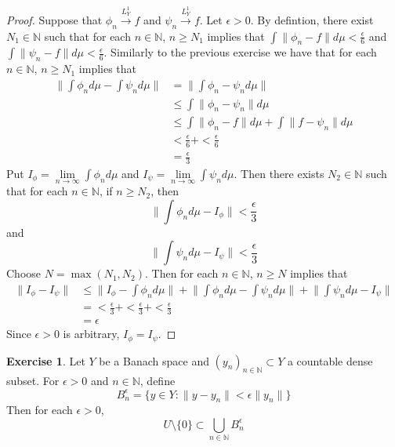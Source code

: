 \documentclass[12pt]{amsart}
\theoremstyle{definition}
\newtheorem{ex}[definition]{Exercise}
\newcommand{\ep}{\epsilon}
\newcommand{\N}{\mathbb{N}}
\newcommand{\conv}[1]{\xrightarrow{#1}}
\newcommand{\lex}[1]{\label{ex:#1}}
\begin{document}
	\begin{proof}
	Suppose that $\phi_n \conv{L^1_Y} f$ and $\psi_n \conv{L^1_Y} f$. Let $\ep >0$. By defintion, there exist $N_1 \in \N$ such that for each $n \in \N$, $ n \geq N_1$ implies that $\int \|\phi_n - f\| d\mu < \frac{\ep}{6}$ and $\int \|\psi_n - f\| d\mu < \frac{\ep}{6}$. Similarly to the previous exercise we have that for each $n \in \N$, $n \geq N_1$ implies that
	\begin{align*}
	\bigg \| \int \phi_n d\mu  - \int \psi_n d \mu \bigg \|
	&= \bigg \| \int \phi_n - \psi_n d\mu \bigg \| \\
	& \leq \int \| \phi_n - \psi_n \| d\mu \\
	& \leq  \int \| \phi_n -f \| d \mu + \int \| f - \psi_n \| d\mu 	\\
	& <  \frac{\ep}{6} + < \frac{\ep}{6} \\
	&= \frac{\ep}{3}
	\end{align*}	 
Put $I_\phi = \lim\limits_{n \rightarrow \infty} \int \phi_n d\mu$ and $I_{\psi} = \lim\limits_{n \rightarrow \infty} \int \psi_n d\mu$. Then there exists $N_2 \in \N$ such that for each $n \in \N$, if $ n \geq N_2$, then $$\bigg \| \int \phi_n d\mu - I_\phi \bigg \| < \frac{\ep}{3}$$ and $$\bigg \| \int \psi_n d\mu - I_\psi \bigg \| < \frac{\ep}{3}$$ 
	Choose $N = \max(N_1, N_2)$. Then for each $n \in \N$, $n \geq N$ implies that
	\begin{align*}
	\|I_\phi - I_\psi\| 
	& \leq \bigg \|I_\phi - \int \phi_n d\mu \bigg \| + \bigg \| \int \phi_n d\mu - \int \psi_n d\mu \bigg \| +  \bigg \| \int \psi_n d\mu - I_\psi \bigg \| \\
	& = < \frac{\ep}{3} + < \frac{\ep}{3} + < \frac{\ep}{3} \\
	&= \ep
	\end{align*}
	Since $\ep >0$ is arbitrary, $I_\phi = I_\psi$.
	\end{proof}
	
	\begin{ex} \lex{00000} 
	Let $Y$ be a Banach space and $(y_n)_{n \in \N} \subset Y$ a countable dense subset. For $\ep >0$ and $n \in \N$, define $$B^{\ep}_n = \{y \in Y: \|y - y_n\| < \ep \| y_n \| \}$$ Then for each $\ep > 0$, $$U \setminus \{ 0 \} \subset \bigcup\limits_{n \in \N}B^{\ep}_n$$
	\end{ex}	
	
\end{document}
